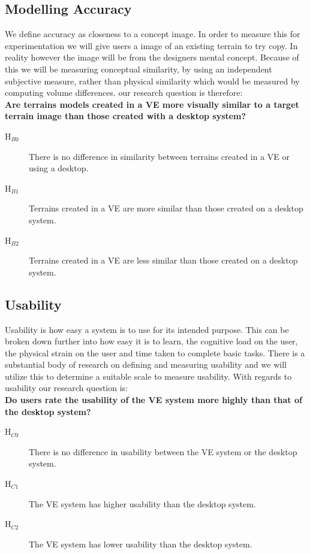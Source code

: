 \documentclass{sig-alternate-05-2015}
\begin{document}
\subsection{Modelling Accuracy}
We define accuracy as closeness to a concept image. In order to measure this for experimentation we will give users a image of an existing terrain to try copy. In reality however the image will be from the designers mental concept. Because of this we will be measuring conceptual similarity, by using an independent subjective measure, rather than physical similarity which would be measured by computing volume differences. our research question is therefore:\\
\textbf{Are terrains models created in a VE more visually similar to a target terrain image than those created with a desktop system?}\\
\begin{description}
	\item [H$_{B0}$] There is no difference in similarity between terrains created in a VE or using a desktop.
	\item [H$_{B1}$] Terrains created in a VE are more similar than those created on a desktop system.
	\item [H$_{B2}$] Terrains created in a VE are less similar than those created on a desktop system.
\end{description}
\subsection{Usability}
Usability is how easy a system is to use for its intended purpose. This can be broken down further into how easy it is to learn, the cognitive load on the user, the physical strain on the user and time taken to complete basic tasks. There is a substantial body of research on defining and measuring usability and we will utilize this to determine a suitable scale to measure usability. With regards to usability our research question is:\\
\textbf{Do users rate the usability of the VE system more highly than that of the desktop system?}\\ 
\begin{description}
	\item [H$_{C0}$] There is no difference in usability between the VE system or the desktop system.
	\item [H$_{C1}$] The VE system has higher usability than the desktop system.
	\item [H$_{C2}$] The VE system has lower usability than the desktop system.
\end{description}
\end{document}
